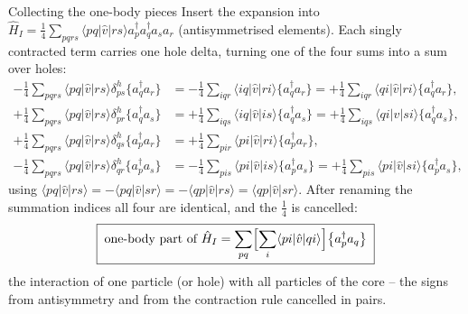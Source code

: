 \documentclass[aspectratio=169,10pt]{beamer}
\newcommand{\element}[3]{\langle #1\vert #2\vert #3\rangle}
\newcommand{\nc}[1]{\bigl\{#1\bigr\}}
\begin{document}
\begin{frame}{Collecting the one-body pieces}
  \footnotesize
  Insert the expansion into $\hat{H}_I=\frac14\sum_{pqrs}\element{pq}{\hat{v}}{rs}a_p^{\dagger}a_q^{\dagger}a_sa_r$ (antisymmetrised elements). Each singly contracted term carries one hole delta, turning one of the four sums into a sum over holes:
  \begin{align*}
    -\tfrac14\sum_{pqrs}\element{pq}{\hat{v}}{rs}\delta^{h}_{ps}\nc{a_q^{\dagger}a_r}
    &=-\tfrac14\sum_{iqr}\element{iq}{\hat{v}}{ri}\nc{a_q^{\dagger}a_r}
    =+\tfrac14\sum_{iqr}\element{qi}{\hat{v}}{ri}\nc{a_q^{\dagger}a_r},\\
    +\tfrac14\sum_{pqrs}\element{pq}{\hat{v}}{rs}\delta^{h}_{pr}\nc{a_q^{\dagger}a_s}
    &=+\tfrac14\sum_{iqs}\element{iq}{\hat{v}}{is}\nc{a_q^{\dagger}a_s}
    =+\tfrac14\sum_{iqs}\element{qi}{\hat{v}}{si}\nc{a_q^{\dagger}a_s},\\
    +\tfrac14\sum_{pqrs}\element{pq}{\hat{v}}{rs}\delta^{h}_{qs}\nc{a_p^{\dagger}a_r}
    &=+\tfrac14\sum_{pir}\element{pi}{\hat{v}}{ri}\nc{a_p^{\dagger}a_r},\\
    -\tfrac14\sum_{pqrs}\element{pq}{\hat{v}}{rs}\delta^{h}_{qr}\nc{a_p^{\dagger}a_s}
    &=-\tfrac14\sum_{pis}\element{pi}{\hat{v}}{is}\nc{a_p^{\dagger}a_s}
    =+\tfrac14\sum_{pis}\element{pi}{\hat{v}}{si}\nc{a_p^{\dagger}a_s},
  \end{align*}
  using $\element{pq}{\hat{v}}{rs}=-\element{pq}{\hat{v}}{sr}=-\element{qp}{\hat{v}}{rs}=\element{qp}{\hat{v}}{sr}$. After renaming the summation indices all four are identical, and the $\frac14$ is cancelled:
  \[
    \boxed{\;\text{one-body part of }\hat{H}_I=\sum_{pq}\Bigl[\sum_i\element{pi}{\hat{v}}{qi}\Bigr]\nc{a_p^{\dagger}a_q}\;}
  \]
  the interaction of one particle (or hole) with all particles of the core -- the signs from antisymmetry and from the contraction rule cancelled in pairs.
\end{frame}
\end{document}
